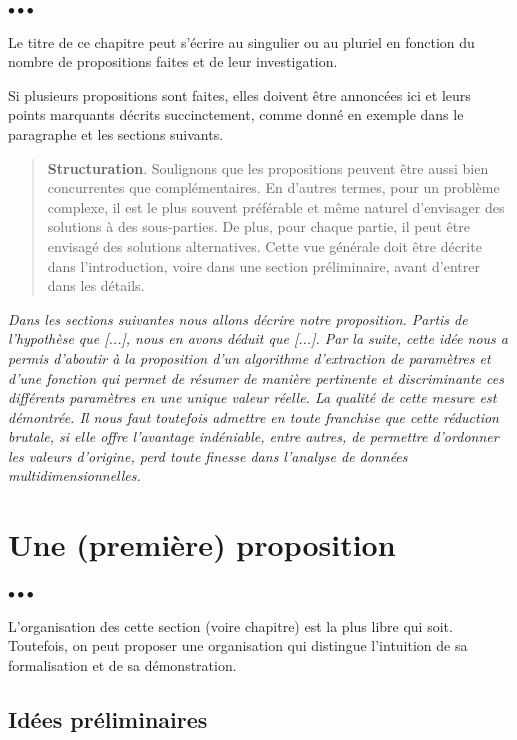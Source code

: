 \documentclass[11pt, french, screen, research-development]{report-rd-info}
\newenvironment{structuration}{\begin{quote}\textbf{Structuration}. }{\end{quote}}
\newenvironment{explanation}
{\color{blue}
 \begin{list}{}{\hspace{0.2\textwidth}\color{blue}}\item $\bullet\bullet\bullet$
}
{\end{list}}
\begin{document}
\begin{explanation}
   Le titre de ce chapitre peut s'écrire au singulier ou au pluriel en fonction du nombre de propositions faites et de leur investigation.

   Si plusieurs propositions sont faites, elles doivent être annoncées ici et leurs points marquants décrits succinctement, comme donné en exemple dans le paragraphe et les sections suivants.

   \begin{structuration}
      Soulignons que les propositions peuvent être aussi bien concurrentes que complémentaires.
      En d'autres termes, pour un problème complexe, il est le plus souvent préférable et même naturel d'envisager des solutions à des sous-parties.
      De plus, pour chaque partie, il peut être envisagé des solutions alternatives.
      Cette vue générale doit être décrite dans l'introduction, voire dans une section préliminaire, avant d'entrer dans les détails.
   \end{structuration}

   \bigskip

   \emph{Dans les sections suivantes nous allons décrire notre proposition.
   Partis de l'hypothèse que [...], nous en avons déduit que [...].
   Par la suite, cette idée nous a permis d'aboutir à la proposition d'un algorithme d'extraction de paramètres et d'une fonction qui permet de résumer de manière pertinente et discriminante ces différents paramètres en une unique valeur réelle.
   La qualité de cette mesure est démontrée.
   Il nous faut toutefois admettre en toute franchise que cette réduction brutale, si elle offre l'avantage indéniable, entre autres, de permettre d'ordonner les valeurs d'origine, perd toute finesse dans l'analyse de données multidimensionnelles.}
\end{explanation}

\section{Une (première) proposition}

\begin{explanation}
   L'organisation des cette section (voire chapitre) est la plus libre qui soit.
   Toutefois, on peut proposer une organisation qui distingue l'intuition de sa formalisation et de sa démonstration.
\end{explanation}

\subsection{Idées préliminaires}
\end{document}
